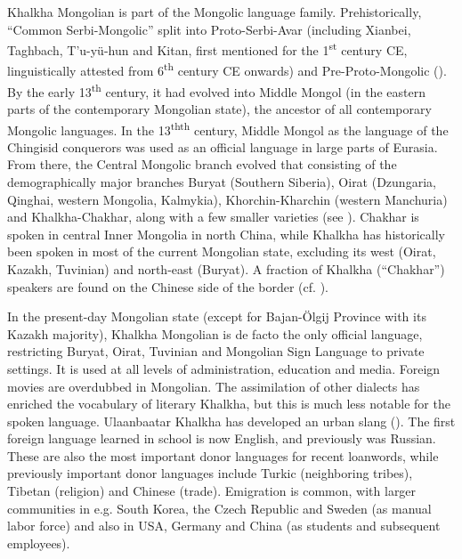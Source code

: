 \documentclass[output=paper,colorlinks,citecolor=brown,chinesefont]{langscibook}
\begin{document}
\largerpage
Khalkha Mongolian is part of the Mongolic language family. Prehistorically, “Common Serbi-Mongolic” split into Proto-Serbi-Avar (including Xianbei, Taghbach, T’u-yü-hun and Kitan, first mentioned for the 1\textsuperscript{st} century CE, linguistically attested from 6\textsuperscript{th} century CE onwards) and Pre-Proto-Mongolic (\citealt[25, 84--85, 116--118, 135--136]{Shimunek2015}). By the early 13\textsuperscript{th} century, it had evolved into Middle Mongol (in the eastern parts of the contemporary Mongolian state), the ancestor of all contemporary Mongolic languages. In the 13\textsuperscript{th}{}\textsuperscript{th} century, Middle Mongol as the language of the Chingisid conquerors was used as an official language in large parts of Eurasia. From there, the Central Mongolic branch evolved that consisting of the demographically major branches Buryat (Southern Siberia), Oirat (Dzungaria, Qinghai, western Mongolia, Kalmykia), Khorchin-Kharchin (western Manchuria) and Khalkha-Chakhar, along with a few smaller varieties (see \citealt{Luvsanvandan1959,Janhunen2006}). Chakhar is spoken in central Inner Mongolia in north China, while Khalkha has historically been spoken in most of the current Mongolian state, excluding its west (Oirat, Kazakh, Tuvinian) and north-east (Buryat). A fraction of Khalkha (“Chakhar”) speakers are found on the Chinese side of the border (cf. \citealt[143]{SvantessonEtAl2005}). 

In the present-day Mongolian state (except for Bajan-Ölgij Province with its Kazakh majority), Khalkha Mongolian is de facto the only official language, restricting Buryat, Oirat, Tuvinian and Mongolian Sign Language to private settings. It is used at all levels of administration, education and media. Foreign movies are overdubbed in Mongolian. The assimilation of other dialects has enriched the vocabulary of literary Khalkha, but this is much less notable for the spoken language. Ulaanbaatar Khalkha has developed an urban slang (\citealt{SambuudorzErdenesuvd2002}). The first foreign language learned in school is now English, and previously was Russian. These are also the most important donor languages for recent loanwords, while previously important donor languages include Turkic (neighboring tribes), Tibetan (religion) and Chinese (trade). Emigration is common, with larger communities in e.g. South Korea, the Czech Republic and Sweden (as manual labor force) and also in USA, Germany and China (as students and subsequent employees).
\end{document}
